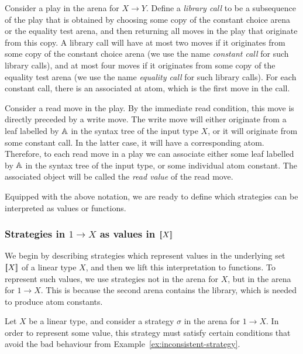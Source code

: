 Consider a play in the arena for $X \to Y$. Define a \emph{library call} to be a subsequence of the play that is obtained by choosing some copy of the constant choice arena or the equality test arena, and then returning all moves in the play that originate from this copy. A library call will have at most two moves if it originates from some copy of the constant choice arena (we use the name \emph{constant call} for such library calls), and at most four moves if it originates from some copy of the equality test arena (we use the name \emph{equality call} for such library calls). For each constant call, there is an associated at atom, which is the first move in the call. 

Consider a read move in the play. By the immediate read condition, this move is directly preceded by a write move. The write move will either originate from a leaf labelled by $\mathbb A$ in  the syntax tree of the input type $X$, or it will originate from some constant call. In the latter case, it will have a corresponding atom. Therefore, to each read move in a play we can associate either some leaf labelled by $\mathbb A$ in the syntax tree of the input type, or some individual atom constant. The associated object will be called the \emph{read value} of the read move.

Equipped with the above notation, we are ready to define which strategies  can  be interpreted as values or functions.

\subsubsection{Strategies in $1 \to X$ as values in $[{\kern-0.45ex}[X]{\kern-0.45ex}]$}
\label{sec:strategies-in-1-to-x-as-elements-of-sem-x}
  We begin by describing strategies which represent values in the underlying set $[{\kern-0.45ex}[X]{\kern-0.45ex}]$ of a linear type $X$, and then we lift this interpretation to functions.  To represent such values, we  use strategies not in the arena for $X$, but in the arena for $1 \to X$. This is because the second arena contains the library, which is needed to  produce  atom constants.

  Let $X$ be a linear type, and consider a strategy $\sigma$ in the arena for $1 \to X$. 
  In order to represent some value, this strategy must satisfy certain conditions that avoid the bad behaviour  from Example~\ref{ex:inconsistent-strategy}.   
  


